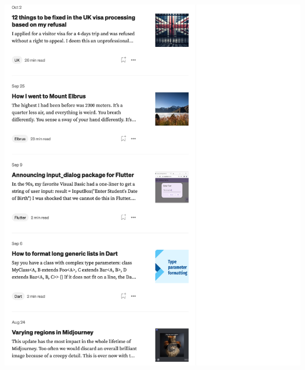 \Continuing
\begin{center}
    \includegraphics[width=40em]{medium-articles-p3}
\end{center}
\WillContinue
\pagebreak

